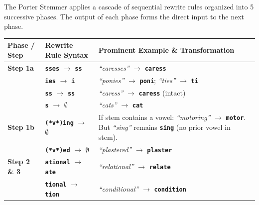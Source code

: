 \documentclass[10pt,a4paper]{article}
\newcommand{\rx}[1]{\texttt{\bfseries\color{inlinecode}#1}}
\begin{document}
\vspace{2pt}
\begin{insightbox}[title={\bfseries\sffamily The Porter Stemmer: Cascaded Rewrite Rules (Porter, 1980)}]
\footnotesize
The Porter Stemmer applies a cascade of sequential rewrite rules organized into 5 successive phases. The output of each phase forms the direct input to the next phase.

\vspace{2pt}
\noindent\begin{tabularx}{\textwidth}{l >{\raggedright\arraybackslash}p{3.5cm} >{\raggedright\arraybackslash}X}
\toprule
\rowcolor{lightbg}
\textbf{Phase / Step} & \textbf{Rewrite Rule Syntax} & \textbf{Prominent Example \& Transformation} \\
\midrule
\textbf{Step 1a} & \rx{sses} $\longrightarrow$ \rx{ss} & \textit{``caresses''} $\longrightarrow$ \rx{caress} \\
& \rx{ies} $\longrightarrow$ \rx{i} & \textit{``ponies''} $\longrightarrow$ \rx{poni}; \quad \textit{``ties''} $\longrightarrow$ \rx{ti} \\
& \rx{ss} $\longrightarrow$ \rx{ss} & \textit{``caress''} $\longrightarrow$ \rx{caress} (intact) \\
& \rx{s} $\longrightarrow$ $\emptyset$ & \textit{``cats''} $\longrightarrow$ \rx{cat} \\
\midrule
\textbf{Step 1b} & \rx{(*v*)ing} $\longrightarrow$ $\emptyset$ & If stem contains a vowel: \textit{``motoring''} $\longrightarrow$ \rx{motor}. \newline But \textit{``sing''} remains \rx{sing} (no prior vowel in stem). \\
& \rx{(*v*)ed} $\longrightarrow$ $\emptyset$ & \textit{``plastered''} $\longrightarrow$ \rx{plaster} \\
\midrule
\textbf{Step 2 \& 3} & \rx{ational} $\longrightarrow$ \rx{ate} & \textit{``relational''} $\longrightarrow$ \rx{relate} \\
& \rx{tional} $\longrightarrow$ \rx{tion} & \textit{``conditional''} $\longrightarrow$ \rx{condition} \\
\bottomrule
\end{tabularx}
\end{insightbox}
\end{document}
